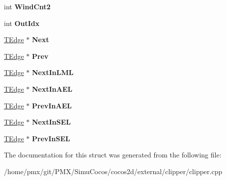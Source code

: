 \begin{DoxyCompactItemize}
int {\bfseries Wind\+Cnt2}
\item 
\mbox{\label{structClipperLib_1_1TEdge_a85d226803a3c54dbc983668f430b7e28}} 
int {\bfseries Out\+Idx}
\item 
\mbox{\label{structClipperLib_1_1TEdge_affaec87c71a6ddbd745ff0db223dc41c}} 
\hyperlink{structClipperLib_1_1TEdge}{T\+Edge} $\ast$ {\bfseries Next}
\item 
\mbox{\label{structClipperLib_1_1TEdge_afff5dd32f4e0ecec650cbc78884f4ecb}} 
\hyperlink{structClipperLib_1_1TEdge}{T\+Edge} $\ast$ {\bfseries Prev}
\item 
\mbox{\label{structClipperLib_1_1TEdge_aeb0b32c00f2c1f87c0071065bf095cec}} 
\hyperlink{structClipperLib_1_1TEdge}{T\+Edge} $\ast$ {\bfseries Next\+In\+L\+ML}
\item 
\mbox{\label{structClipperLib_1_1TEdge_a2fefae61dadfb555d2309ee247f46881}} 
\hyperlink{structClipperLib_1_1TEdge}{T\+Edge} $\ast$ {\bfseries Next\+In\+A\+EL}
\item 
\mbox{\label{structClipperLib_1_1TEdge_a664323f2550dabeff16e4ccb96a77940}} 
\hyperlink{structClipperLib_1_1TEdge}{T\+Edge} $\ast$ {\bfseries Prev\+In\+A\+EL}
\item 
\mbox{\label{structClipperLib_1_1TEdge_a84b952916b3008ea9bf2caf7f64e6dfb}} 
\hyperlink{structClipperLib_1_1TEdge}{T\+Edge} $\ast$ {\bfseries Next\+In\+S\+EL}
\item 
\mbox{\label{structClipperLib_1_1TEdge_abdc885834e446395b5f26b5cc99dc53a}} 
\hyperlink{structClipperLib_1_1TEdge}{T\+Edge} $\ast$ {\bfseries Prev\+In\+S\+EL}
\end{DoxyCompactItemize}


The documentation for this struct was generated from the following file\+:\begin{DoxyCompactItemize}
\item 
/home/pmx/git/\+P\+M\+X/\+Simu\+Cocos/cocos2d/external/clipper/clipper.\+cpp\end{DoxyCompactItemize}
